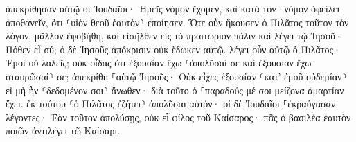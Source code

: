 \documentclass{openreader}
\begin{document}
ἀπεκρίθησαν αὐτῷ οἱ Ἰουδαῖοι· Ἡμεῖς νόμον ἔχομεν, καὶ κατὰ τὸν ⸀νόμον ὀφείλει ἀποθανεῖν, ὅτι ⸂υἱὸν θεοῦ ἑαυτὸν⸃ ἐποίησεν. 
Ὅτε οὖν ἤκουσεν ὁ Πιλᾶτος τοῦτον τὸν λόγον, μᾶλλον ἐφοβήθη, 
καὶ εἰσῆλθεν εἰς τὸ πραιτώριον πάλιν καὶ λέγει τῷ Ἰησοῦ· Πόθεν εἶ σύ; ὁ δὲ Ἰησοῦς ἀπόκρισιν οὐκ ἔδωκεν αὐτῷ. 
λέγει οὖν αὐτῷ ὁ Πιλᾶτος· Ἐμοὶ οὐ λαλεῖς; οὐκ οἶδας ὅτι ἐξουσίαν ἔχω ⸂ἀπολῦσαί σε καὶ ἐξουσίαν ἔχω σταυρῶσαί⸃ σε; 
ἀπεκρίθη ⸀αὐτῷ Ἰησοῦς· Οὐκ εἶχες ἐξουσίαν ⸂κατ’ ἐμοῦ οὐδεμίαν⸃ εἰ μὴ ἦν ⸂δεδομένον σοι⸃ ἄνωθεν· διὰ τοῦτο ὁ ⸀παραδούς μέ σοι μείζονα ἁμαρτίαν ἔχει. 
ἐκ τούτου ⸂ὁ Πιλᾶτος ἐζήτει⸃ ἀπολῦσαι αὐτόν· οἱ δὲ Ἰουδαῖοι ⸀ἐκραύγασαν λέγοντες· Ἐὰν τοῦτον ἀπολύσῃς, οὐκ εἶ φίλος τοῦ Καίσαρος· πᾶς ὁ βασιλέα ἑαυτὸν ποιῶν ἀντιλέγει τῷ Καίσαρι. 
\end{document}
